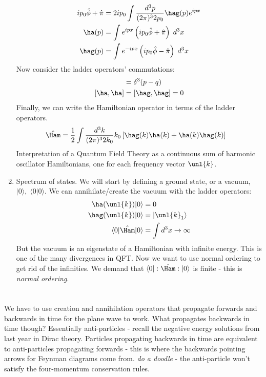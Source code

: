 \documentclass[a4paper, 11pt, normalem]{report}
\newcommand\hphi{\hat{\phi}}
\newcommand\hpi{\hat{\pi}}
\begin{document}
\begin{enumerate}
\begin{align}
            ip_0\hphi + \hpi &= 2ip_0 \int\frac{d^3p}{(2\pi)^32p_0} \hag(p)e^{ipx} \\
            \ha(p) &= \int e^{ipx}\left(ip_0\hphi + \hpi\right)\;d^3x \\
            \hag(p) &= \int e^{-ipx}\left(ip_0\hphi - \hpi\right)\;d^3x
        \end{align}
        Now consider the ladder operators' commutations:
        \begin{align}
            [\ha(p),\hag(q)] &= \delta^3(p-q) \\
            [\ha,\ha] &= [\hag,\hag] = 0
        \end{align}
        Finally, we can write the Hamiltonian operator in terms of the ladder operators. 
        \begin{align}
            \hat{\Ham} &= \frac12 \int \frac{d^3k}{(2\pi)^32k_0} k_0\left[\hag(k)\ha(k) + \ha(k)\hag(k)\right]
        \end{align}
        Interpretation of a Quantum Field Theory as a continuous sum of harmonic oscillator Hamiltonians, one for each frequency vector $\unl{k}$.
    \item Spectrum of states. 
        We will start by defining a ground state, or a vacuum, $|0\rangle,\;\langle0|0\rangle$.
        We can annihilate/create the vacuum with the ladder operators:
        \begin{align}
            \ha(\unl{k})|0\rangle &= 0 \\
            \hag(\unl{k})|0\rangle &= |\unl{k}_1\rangle \\
            \langle0|\hat{\Ham}|0\rangle &= \int d^3x \to \infty
        \end{align}
        But the vacuum is an eigenstate of a Hamiltonian with infinite energy. 
        This is one of the many divergences in QFT.
        Now we want to use normal ordering to get rid of the infinities. 
        We demand that $\langle0|:\hat{\Ham}:|0\rangle$ is finite - this is \textit{normal ordering}. 
\end{enumerate}


\chapter{}
We have to use creation and annihilation operators that propagate forwards and backwards in time for the plane wave to work. 
What propagates backwards in time though?
Essentially anti-particles - recall the negative energy solutions from last year in Dirac theory. 
Particles propagating backwards in time are equivalent to anti-particles propagating forwards - this is where the backwards pointing arrows for Feynman diagrams come from. 
\textit{do a doodle} - the anti-particle won't satisfy the four-momentum conservation rules. 
\end{document}
